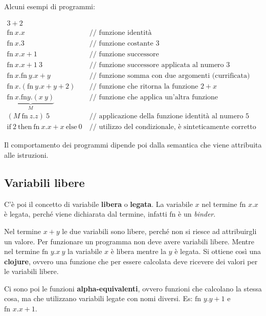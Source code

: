 Alcuni esempi di programmi:

\begin{align*}
3 + 2 &\\
\text{fn} \:  x.x &\:\text{// funzione identità} \\
\text{fn} \: x.3 &\: \text{// funzione costante 3} \\
\text{fn} \: x.x+1 &\: \text{// funzione successore} \\
\text{fn} \: x.x+1 \: 3 &\: \text{// funzione successore applicata al numero 3} \\
\text{fn} \: x.\text{fn} \: y . x+y &\: \text{// funzione somma con due argomenti (currificata)} \\
\text{fn} \: x. (\text{fn} \: y . x+y   + 2) &\: \text{// funzione che ritorna la funzione $2+x$} \\
\underbrace{\text{fn} \: x.\text{fn} y.(x\: y)}_{M} &\: \text{// funzione che applica un'altra funzione} \\
(M \: \text{fn} \: z.z) \: 5 &\: \text{// applicazione della funzione identità al numero 5} \\
\text{if} \: 2 \: \text{then} \: \text{fn}\: x.x+x \: \text{else} \: 0 &\: \text{// utilizzo del condizionale, è sinteticamente corretto ma non a livello di tipi}
\end{align*}

\noindent Il comportamento dei programmi dipende poi dalla semantica che viene attribuita alle istruzioni.

\subsection{Variabili libere}

C'è poi il concetto di variabile \textbf{libera} o \textbf{legata}.
La variabile $x$ nel termine $\text{fn } x.x$ è legata, perché viene dichiarata dal termine, infatti $\text{fn}$ è un \textit{binder}.

Nel termine $x+y$ le due variabili sono libere, perché non si riesce ad attribuirgli un valore. Per funzionare un programma non deve avere variabili libere.
Mentre nel termine $\text{fn }y. x\: y$ la variabile $x$ è libera mentre la $y$ è legata. Si ottiene così una \textbf{clojure}, ovvero una funzione che per essere calcolata deve ricevere dei valori per le variabili libere.

Ci sono poi le funzioni \textbf{alpha-equivalenti}, ovvero funzioni che calcolano la stessa cosa, ma che utilizzano variabili legate con nomi diversi. Es: $\text{fn }y.y+1$ e $\text{fn }x.x+1$.

